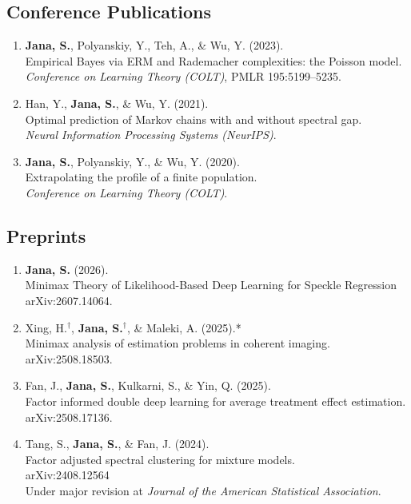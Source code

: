 \documentclass[11pt]{article}
\begin{document}
	\subsection*{Conference Publications}
	\begin{enumerate}[label=C\arabic*.]
		
		\item \textbf{Jana, S.}, Polyanskiy, Y., Teh, A., \& Wu, Y. (2023). \\
		Empirical Bayes via ERM and Rademacher complexities: the Poisson model. \\
		\textit{Conference on Learning Theory (COLT)}, PMLR 195:5199--5235.
		
		\item Han, Y., \textbf{Jana, S.}, \& Wu, Y. (2021). \\
		Optimal prediction of Markov chains with and without spectral gap. \\
		\textit{Neural Information Processing Systems (NeurIPS)}.
		
		\item \textbf{Jana, S.}, Polyanskiy, Y., \& Wu, Y. (2020). \\
		Extrapolating the profile of a finite population. \\
		\textit{Conference on Learning Theory (COLT)}.
		
	\end{enumerate}
	
	\subsection*{Preprints}
	\begin{enumerate}[label=P\arabic*.]
		
		\item \textbf{Jana, S.} (2026).\\
		Minimax Theory of Likelihood-Based Deep Learning for Speckle Regression\\
		arXiv:2607.14064.
		
		\item Xing, H.$^\dagger$, \textbf{Jana, S.}$^\dagger$, \& Maleki, A. (2025).* \\
		Minimax analysis of estimation problems in coherent imaging. \\
		arXiv:2508.18503.
		
		\item Fan, J., \textbf{Jana, S.}, Kulkarni, S., \& Yin, Q. (2025). \\
		Factor informed double deep learning for average treatment effect estimation. \\
		arXiv:2508.17136.
		
		
		\item Tang, S., \textbf{Jana, S.}, \& Fan, J. (2024). \\
		Factor adjusted spectral clustering for mixture models. \\
		arXiv:2408.12564\\
		Under major revision at \textit{Journal of the American Statistical Association}.
		
	\end{enumerate}
	
\end{document}
